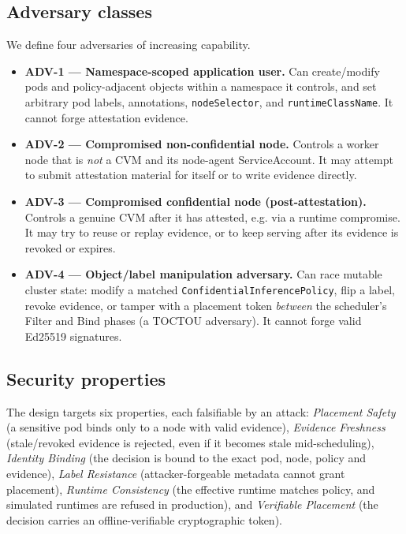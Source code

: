 \subsection{Adversary classes}
We define four adversaries of increasing capability.

\begin{itemize}
  \item \textbf{ADV-1 --- Namespace-scoped application user.} Can create/modify pods and
  policy-adjacent objects within a namespace it controls, and set arbitrary
  pod labels, annotations, \texttt{nodeSelector}, and \texttt{runtimeClassName}.
  It cannot forge attestation evidence.
  \item \textbf{ADV-2 --- Compromised non-confidential node.} Controls a worker node that
  is \emph{not} a CVM and its node-agent ServiceAccount. It may attempt to
  submit attestation material for itself or to write evidence directly.
  \item \textbf{ADV-3 --- Compromised confidential node (post-attestation).} Controls a
  genuine CVM after it has attested, e.g. via a runtime compromise. It may try
  to reuse or replay evidence, or to keep serving after its evidence is revoked
  or expires.
  \item \textbf{ADV-4 --- Object/label manipulation adversary.} Can race mutable cluster
  state: modify a matched \texttt{ConfidentialInferencePolicy}, flip a label,
  revoke evidence, or tamper with a placement token \emph{between} the
  scheduler's Filter and Bind phases (a TOCTOU adversary). It cannot forge
  valid Ed25519 signatures.
\end{itemize}

\subsection{Security properties}
The design targets six properties, each falsifiable by an attack:
\emph{Placement Safety} (a sensitive pod binds only to a node with valid
evidence), \emph{Evidence Freshness} (stale/revoked evidence is rejected, even
if it becomes stale mid-scheduling), \emph{Identity Binding} (the decision is
bound to the exact pod, node, policy and evidence), \emph{Label Resistance}
(attacker-forgeable metadata cannot grant placement), \emph{Runtime
Consistency} (the effective runtime matches policy, and simulated runtimes are
refused in production), and \emph{Verifiable Placement} (the decision carries an
offline-verifiable cryptographic token).

